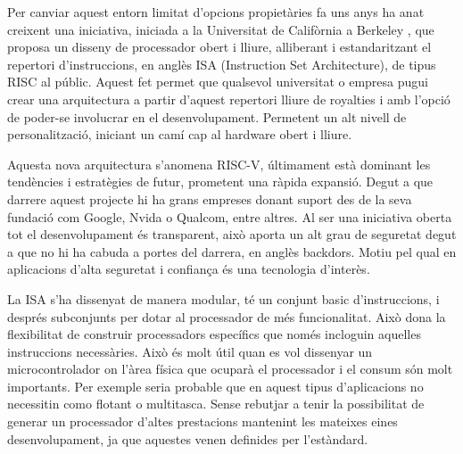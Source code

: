 \documentclass[10pt,a4paper,twocolumn,twoside]{article}
\begin{document}
Per canviar aquest entorn limitat d'opcions propietàries fa uns anys ha anat creixent una iniciativa, iniciada a la Universitat de Califòrnia a Berkeley \cite{krste_asanovic_instruction_2014}, que proposa un disseny de processador obert i lliure, alliberant i estandaritzant el repertori d'instruccions, en anglès ISA (Instruction Set Architecture), de tipus RISC al públic. Aquest fet permet que qualsevol universitat o empresa pugui crear una arquitectura a partir d'aquest repertori lliure de royalties i amb l'opció de poder-se involucrar en el desenvolupament. Permetent un alt nivell de personalització, iniciant un camí cap al hardware obert i lliure. 

Aquesta nova arquitectura s'anomena RISC-V, últimament està dominant les tendències i estratègies de futur, prometent una ràpida expansió. Degut a que darrere aquest projecte hi ha grans empreses donant suport des de la seva fundació com Google, Nvida o Qualcom, entre altres. 
Al ser una iniciativa oberta tot el desenvolupament és transparent, això aporta un alt grau de seguretat degut a que no hi ha cabuda a portes del darrera, en anglès backdors. Motiu pel qual en aplicacions d'alta seguretat i confiança és una tecnologia d'interès.

La ISA s'ha dissenyat de manera modular, té un conjunt basic d’instruccions, i després subconjunts per dotar al processador de més funcionalitat. 
Això dona la flexibilitat de construir processadors específics que només incloguin aquelles instruccions necessàries. 
Això és molt útil quan es vol dissenyar un microcontrolador on l’àrea física que ocuparà el processador i el consum són molt importants. 
Per exemple seria probable que en aquest tipus d’aplicacions no necessitin como flotant o multitasca.
Sense rebutjar a tenir la possibilitat de generar un processador d'altes prestacions mantenint les mateixes eines desenvolupament, ja que aquestes venen definides per l'estàndard.
\end{document}
